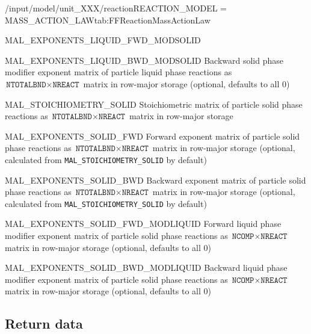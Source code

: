 \begin{condsubgroup}{/input/model/unit\_XXX/reaction}{REACTION\_MODEL = MASS\_ACTION\_LAW}{tab:FFReactionMassActionLaw}
\begin{dataset}[type=double,length={$\texttt{NTOTALBND} \cdot \texttt{NREACT}$}]{MAL\_EXPONENTS\_LIQUID\_FWD\_MODSOLID
}
  \end{dataset}
  \begin{dataset}[type=double,length={$\texttt{NTOTALBND} \cdot \texttt{NREACT}$}]{MAL\_EXPONENTS\_LIQUID\_BWD\_MODSOLID
}
    Backward solid phase modifier exponent matrix of particle liquid phase reactions as $\texttt{NTOTALBND} \times \texttt{NREACT}$ matrix in row-major storage (optional, defaults to all $0$)
  \end{dataset}
  \begin{dataset}[type=double,length={$\texttt{NTOTALBND} \cdot \texttt{NREACT}$}]{MAL\_STOICHIOMETRY\_SOLID
}
    Stoichiometric matrix of particle solid phase reactions as $\texttt{NTOTALBND} \times \texttt{NREACT}$ matrix in row-major storage
  \end{dataset}
  \begin{dataset}[type=double,length={$\texttt{NTOTALBND} \cdot \texttt{NREACT}$}]{MAL\_EXPONENTS\_SOLID\_FWD
}
    Forward exponent matrix of particle solid phase reactions as $\texttt{NTOTALBND} \times \texttt{NREACT}$ matrix in row-major storage (optional, calculated from \texttt{MAL\_STOICHIOMETRY\_SOLID} by default)
  \end{dataset}
  \begin{dataset}[type=double,length={$\texttt{NTOTALBND} \cdot \texttt{NREACT}$}]{MAL\_EXPONENTS\_SOLID\_BWD
}
    Backward exponent matrix of particle solid phase reactions as $\texttt{NTOTALBND} \times \texttt{NREACT}$ matrix in row-major storage (optional, calculated from \texttt{MAL\_STOICHIOMETRY\_SOLID} by default)
  \end{dataset}
  \begin{dataset}[type=double,length={$\texttt{NCOMP} \cdot \texttt{NREACT}$}]{MAL\_EXPONENTS\_SOLID\_FWD\_MODLIQUID
}
    Forward liquid phase modifier exponent matrix of particle solid phase reactions as $\texttt{NCOMP} \times \texttt{NREACT}$ matrix in row-major storage (optional, defaults to all $0$)
  \end{dataset}
  \begin{dataset}[type=double,length={$\texttt{NCOMP} \cdot \texttt{NREACT}$}]{MAL\_EXPONENTS\_SOLID\_BWD\_MODLIQUID
}
    Backward liquid phase modifier exponent matrix of particle solid phase reactions as $\texttt{NCOMP} \times \texttt{NREACT}$ matrix in row-major storage (optional, defaults to all $0$)
  \end{dataset}
\end{condsubgroup}

\subsection{Return data}

